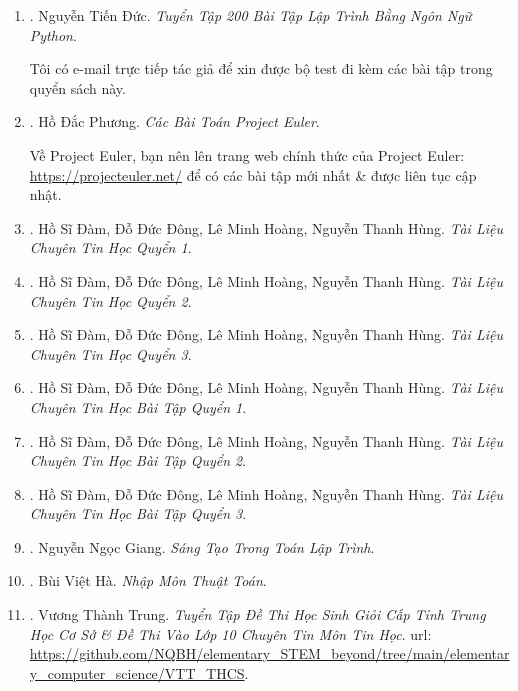 \documentclass[12pt,twoside]{book}
\begin{document}
\begin{enumerate}
	\item \cite{Duc_200_BT_Python}. {\sc Nguyễn Tiến Đức}. {\it Tuyển Tập 200 Bài Tập Lập Trình Bằng Ngôn Ngữ Python}.
	
	Tôi có e-mail trực tiếp tác giả để xin được bộ test đi kèm các bài tập trong quyển sách này.
	
	\item \cite{Phuong_project_Euler}. {\sc Hồ Đắc Phương}. {\it Các Bài Toán Project Euler}.
	
	Về Project Euler, bạn nên lên trang web chính thức của Project Euler: \url{https://projecteuler.net/} để có các bài tập mới nhất \& được liên tục cập nhật.
	
	\item \cite{TL_chuyen_Tin_quyen_1}. {\sc Hồ Sĩ Đàm, Đỗ Đức Đông, Lê Minh Hoàng, Nguyễn Thanh Hùng}. {\it Tài Liệu Chuyên Tin Học Quyển 1}.
	
	\item \cite{TL_chuyen_Tin_quyen_2}. {\sc Hồ Sĩ Đàm, Đỗ Đức Đông, Lê Minh Hoàng, Nguyễn Thanh Hùng}. {\it Tài Liệu Chuyên Tin Học Quyển 2}.
	
	\item \cite{TL_chuyen_Tin_quyen_3}. {\sc Hồ Sĩ Đàm, Đỗ Đức Đông, Lê Minh Hoàng, Nguyễn Thanh Hùng}. {\it Tài Liệu Chuyên Tin Học Quyển 3}.
	
	\item \cite{TL_chuyen_Tin_BT_quyen_1}. {\sc Hồ Sĩ Đàm, Đỗ Đức Đông, Lê Minh Hoàng, Nguyễn Thanh Hùng}. {\it Tài Liệu Chuyên Tin Học Bài Tập Quyển 1}.
	
	\item \cite{TL_chuyen_Tin_BT_quyen_2}. {\sc Hồ Sĩ Đàm, Đỗ Đức Đông, Lê Minh Hoàng, Nguyễn Thanh Hùng}. {\it Tài Liệu Chuyên Tin Học Bài Tập Quyển 2}.
	
	\item \cite{TL_chuyen_Tin_BT_quyen_3}. {\sc Hồ Sĩ Đàm, Đỗ Đức Đông, Lê Minh Hoàng, Nguyễn Thanh Hùng}. {\it Tài Liệu Chuyên Tin Học Bài Tập Quyển 3}.
	
	\item \cite{Giang_sang_tao_lap_trinh}. {\sc Nguyễn Ngọc Giang}. {\it Sáng Tạo Trong Toán Lập Trình}.
	
	\item \cite{Ha_nhap_mon_thuat_toan}. {\sc Bùi Việt Hà}. {\it Nhập Môn Thuật Toán}.
	
	\item \cite{Trung_THCS_Tin}. {\sc Vương Thành Trung}. {\it Tuyển Tập Đề Thi Học Sinh Giỏi Cấp Tỉnh Trung Học Cơ Sở \& Đề Thi Vào Lớp 10 Chuyên Tin Môn Tin Học}. {\sc url}: \url{https://github.com/NQBH/elementary_STEM_beyond/tree/main/elementary_computer_science/VTT_THCS}.
	

\end{enumerate}
\end{document}
